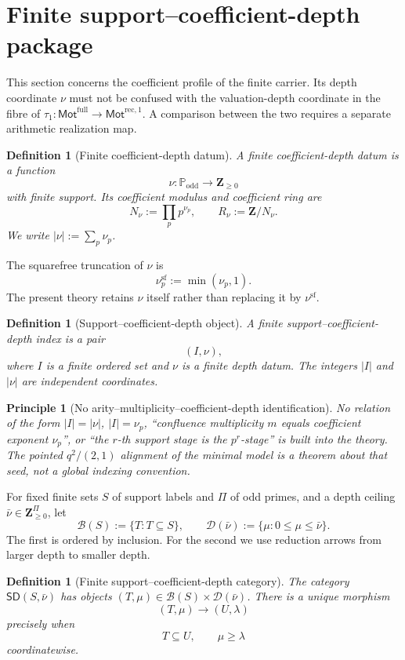 \documentclass[11pt]{article}
\newtheorem{definition}[theorem]{Definition}
\newtheorem{principle}[theorem]{Principle}
\theoremstyle{remark}
\newcommand{\Z}{\mathbf Z}
\providecommand{\RecOneMot}{\mathsf{Mot}^{\mathrm{rec},1}}
\providecommand{\FullMot}{\mathsf{Mot}^{\mathrm{full}}}
\providecommand{\tauone}{\tau_{1}}
\providecommand{\SD}{\mathsf{SD}}
\begin{document}
\section{Finite support--coefficient-depth package}

This section concerns the coefficient profile of the finite carrier.  Its depth
coordinate \(\nu\) must not be confused with the valuation-depth coordinate in the
fibre of \(\tauone:\FullMot\to\RecOneMot\).  A comparison between the two requires a
separate arithmetic realization map.

\begin{definition}[Finite coefficient-depth datum]
A finite coefficient-depth datum is a function
\[
 \nu:\mathbb P_{\mathrm{odd}}\longrightarrow\Z_{\ge0}
\]
with finite support.  Its coefficient modulus and coefficient ring are
\[
 N_\nu:=\prod_p p^{\nu_p},
 \qquad
 R_\nu:=\Z/N_\nu.
\]
We write \(|\nu|:=\sum_p\nu_p\).
\end{definition}

The squarefree truncation of \(\nu\) is
\[
 \nu^{\mathrm{sf}}_p:=\min(\nu_p,1).
\]
The present theory retains \(\nu\) itself rather than replacing it by \(\nu^{\mathrm{sf}}\).

\begin{definition}[Support--coefficient-depth object]
A finite support--coefficient-depth index is a pair
\[
 (I,\nu),
\]
where \(I\) is a finite ordered set and \(\nu\) is a finite depth datum.  The integers \(|I|\) and \(|\nu|\) are independent coordinates.
\end{definition}

\begin{principle}[No arity--multiplicity--coefficient-depth identification]
No relation of the form \(|I|=|\nu|\), \(|I|=\nu_p\), ``confluence multiplicity $m$ equals coefficient exponent $\nu_p$'', or ``the $r$-th support stage is the $p^r$-stage'' is built into the theory.  The pointed $q^2/(2,1)$ alignment of the minimal model is a theorem about that seed, not a global indexing convention.
\end{principle}

For fixed finite sets \(S\) of support labels and \(\Pi\) of odd primes, and a depth ceiling \(\bar\nu\in\Z_{\ge0}^{\Pi}\), let
\[
 \mathcal B(S):=\{T:T\subseteq S\},
 \qquad
 \mathcal D(\bar\nu):=\{\mu:0\le\mu\le\bar\nu\}.
\]
The first is ordered by inclusion.  For the second we use reduction arrows from larger depth to smaller depth.

\begin{definition}[Finite support--coefficient-depth category]
The category \(\SD(S,\bar\nu)\) has objects \((T,\mu)\in\mathcal B(S)\times\mathcal D(\bar\nu)\).  There is a unique morphism
\[
 (T,\mu)\longrightarrow(U,\lambda)
\]
precisely when
\[
 T\subseteq U,
 \qquad
 \mu\ge\lambda
\]
coordinatewise.
\end{definition}
\end{document}
